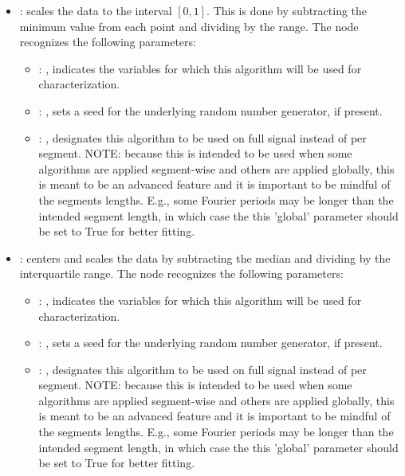 \begin{itemize}
    \item {}:
      scales the data to the interval $[0, 1]$. This is done by subtracting the
      minimum value from each point and dividing by the range.
      The  node recognizes the following parameters:
        \begin{itemize}
          \item {}: ,
            indicates the variables for which this algorithm will be used for characterization.
          \item {}: ,
            sets a seed for the underlying random number generator, if present.
          \item {}: ,
            designates this algorithm to be used on full signal instead of per
            segment. NOTE: because this is intended to be used when some algorithms are
            applied segment-wise and others are applied globally, this is meant to be an
            advanced feature and it is important to be mindful of the segments lengths.
            E.g., some Fourier periods may be longer than the intended segment length, in
            which case the this 'global' parameter should be set to True for better
            fitting. 
      \end{itemize}

    \item {}:
      centers and scales the data by subtracting the median and dividing by     the interquartile
      range.
      The  node recognizes the following parameters:
        \begin{itemize}
          \item {}: ,
            indicates the variables for which this algorithm will be used for characterization.
          \item {}: ,
            sets a seed for the underlying random number generator, if present.
          \item {}: ,
            designates this algorithm to be used on full signal instead of per
            segment. NOTE: because this is intended to be used when some algorithms are
            applied segment-wise and others are applied globally, this is meant to be an
            advanced feature and it is important to be mindful of the segments lengths.
            E.g., some Fourier periods may be longer than the intended segment length, in
            which case the this 'global' parameter should be set to True for better
            fitting. 
      \end{itemize}


\end{itemize}
